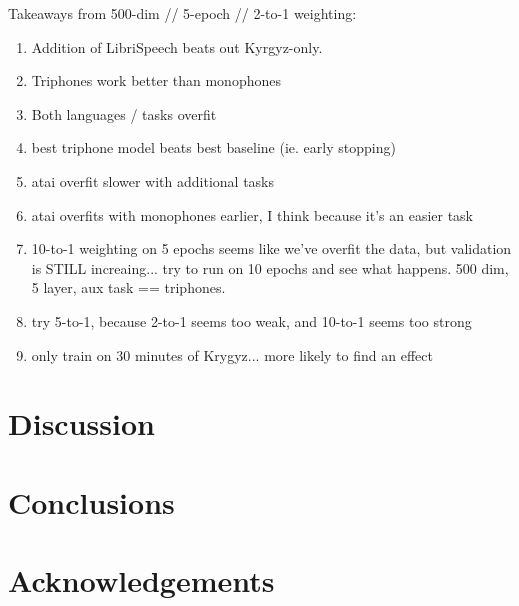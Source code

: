 \documentclass[a4paper]{article}
\begin{document}
Takeaways from 500-dim // 5-epoch // 2-to-1 weighting:

\begin{enumerate}
\item Addition of LibriSpeech beats out Kyrgyz-only.
\item Triphones work better than monophones
\item Both languages / tasks overfit
\item best triphone model beats best baseline (ie. early stopping)
\item atai overfit slower with additional tasks
\item atai overfits with monophones earlier, I think because it's an easier task
\item 10-to-1 weighting on 5 epochs seems like we've overfit the data, but validation is STILL increaing... try to run on 10 epochs and see what happens. 500 dim, 5 layer, aux task == triphones.
\item try 5-to-1, because 2-to-1 seems too weak, and 10-to-1 seems too strong
  \item only train on 30 minutes of Krygyz... more likely to find an effect
\end{enumerate}




\section{Discussion}


\section{Conclusions}

\section{Acknowledgements}






\end{document}
